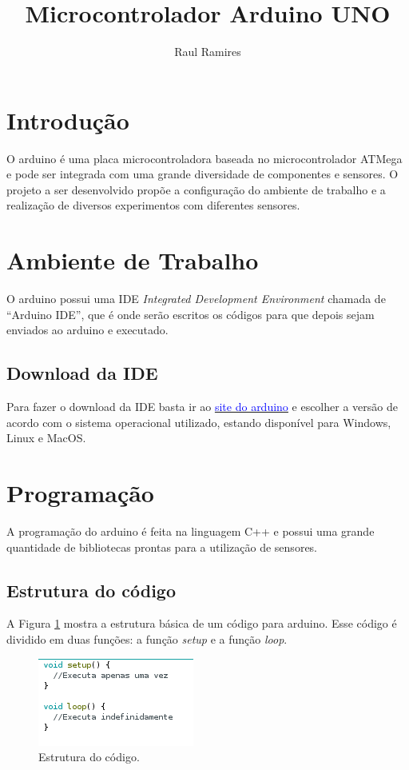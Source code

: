 \documentclass[12pt]{article}
\title{\textbf{Microcontrolador Arduino UNO}}
\author{Raul Ramires\inst{1}}
\begin{document}
 

\maketitle

\section{Introdução}
	O arduino é uma placa microcontroladora baseada no microcontrolador ATMega e pode ser integrada com uma grande diversidade de componentes e sensores. O projeto a ser desenvolvido propõe a configuração do ambiente de trabalho e a realização de diversos experimentos com diferentes sensores.

\section{Ambiente de Trabalho}
	O arduino possui uma IDE \textit{Integrated Development Environment} chamada de ``Arduino IDE'', que é onde serão escritos os códigos para que depois sejam enviados ao arduino e executado.

\subsection{Download da IDE}
	Para fazer o download da IDE basta ir ao \href{https://www.arduino.cc/en/Main/Software}{\underline{\textcolor{blue}{site do arduino}}} e escolher a versão de acordo com o sistema operacional utilizado, estando disponível para Windows, Linux e MacOS.

\section{Programação}
	A programação do arduino é feita na linguagem C++ e possui uma grande quantidade de bibliotecas prontas para a utilização de sensores.

\subsection{Estrutura do código}
	A Figura \ref{figEstruturaCodigo} mostra a estrutura básica de um código para arduino. Esse código é dividido em duas funções: a função \textit{setup} e a função \textit{loop}.

	\begin{figure}[h!]
		\centering
		\includegraphics[scale=1.3]{Imagens/figEstrutura.png}
		\caption{Estrutura do código.}
		\label{figEstruturaCodigo}
	\end{figure}
\end{document}
